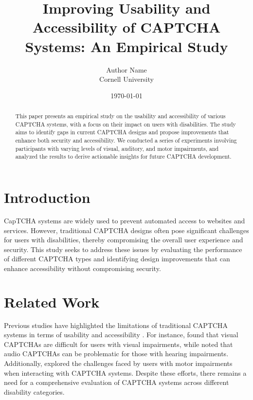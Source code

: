 \documentclass{article}
\title{Improving Usability and Accessibility of CAPTCHA Systems: An Empirical Study}
\author{Author Name \\ Cornell University}
\date{\today}
\begin{document}
\maketitle

\begin{abstract}
This paper presents an empirical study on the usability and accessibility of various CAPTCHA systems, with a focus on their impact on users with disabilities. The study aims to identify gaps in current CAPTCHA designs and propose improvements that enhance both security and accessibility. We conducted a series of experiments involving participants with varying levels of visual, auditory, and motor impairments, and analyzed the results to derive actionable insights for future CAPTCHA development.
\end{abstract}

\section{Introduction}
CapTCHA systems are widely used to prevent automated access to websites and services. However, traditional CAPTCHA designs often pose significant challenges for users with disabilities, thereby compromising the overall user experience and security. This study seeks to address these issues by evaluating the performance of different CAPTCHA types and identifying design improvements that can enhance accessibility without compromising security.

\section{Related Work}
Previous studies have highlighted the limitations of traditional CAPTCHA systems in terms of usability and accessibility \cite{capthausability}. For instance, \cite{visualcaptha} found that visual CAPTCHAs are difficult for users with visual impairments, while \cite{audiocaptha} noted that audio CAPTCHAs can be problematic for those with hearing impairments. Additionally, \cite{motorcaptha} explored the challenges faced by users with motor impairments when interacting with CAPTCHA systems. Despite these efforts, there remains a need for a comprehensive evaluation of CAPTCHA systems across different disability categories.
\end{document}
